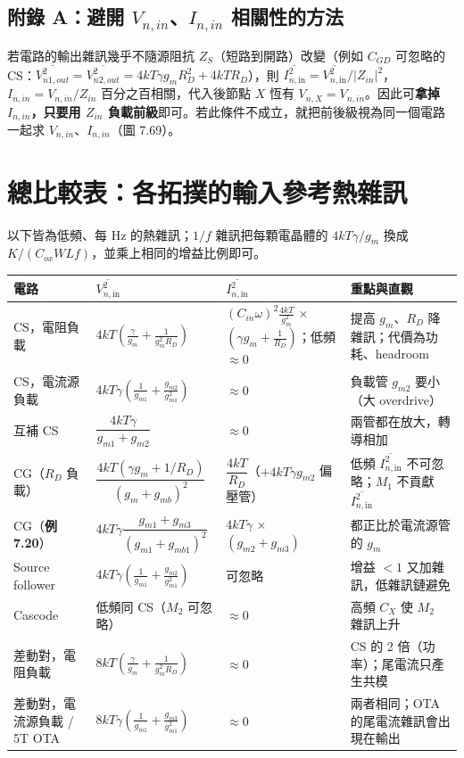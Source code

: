 \documentclass[11pt,a4paper]{article}
\newcommand{\Vsq}[1]{\overline{V^2_{n,\text{#1}}}}
\newcommand{\Isq}[1]{\overline{I^2_{n,\text{#1}}}}
\newcommand{\exref}[1]{\textcolor{extag}{\textbf{\sffamily 例 #1}}}
\begin{document}
\subsection{附錄 A：避開 $V_{n,in}$、$I_{n,in}$ 相關性的方法}
若電路的輸出雜訊幾乎不隨源阻抗 $Z_S$（短路到開路）改變（例如 $C_{GD}$ 可忽略的 CS：$\overline{V^2_{n1,out}}=\overline{V^2_{n2,out}}=4kT\gamma g_mR_D^2+4kTR_D$），則 $\Isq{in}=\Vsq{in}/|Z_{in}|^2$，$I_{n,in}=V_{n,in}/Z_{in}$ 百分之百相關，代入後節點 $X$ 恆有 $V_{n,X}=V_{n,in}$。因此可\textbf{拿掉 $I_{n,in}$，只要用 $Z_{in}$ 負載前級}即可。若此條件不成立，就把前後級視為同一個電路一起求 $V_{n,in}$、$I_{n,in}$（圖 7.69）。

\section{總比較表：各拓撲的輸入參考熱雜訊}
以下皆為低頻、每 Hz 的熱雜訊；$1/f$ 雜訊把每顆電晶體的 $4kT\gamma/g_m$ 換成 $K/(C_{ox}WLf)$，並乘上相同的增益比例即可。

\begin{tabularx}{\linewidth}{>{\raggedright}p{2.3cm}>{\raggedright}p{5.0cm}>{\raggedright}p{2.6cm}X}
\toprule
電路 & $\Vsq{in}$ & $\Isq{in}$ & 重點與直觀\tabularnewline\midrule
CS，電阻負載 & $4kT\left(\frac{\gamma}{g_m}+\frac{1}{g_m^2R_D}\right)$ & $(C_{in}\omega)^2\frac{4kT}{g_m^2}\,\times$ $(\gamma g_m+\frac1{R_D})$；低頻 $\approx0$ & 提高 $g_m$、$R_D$ 降雜訊；代價為功耗、headroom\tabularnewline
CS，電流源負載 & $4kT\gamma\left(\frac1{g_{m1}}+\frac{g_{m2}}{g_{m1}^2}\right)$ & $\approx0$ & 負載管 $g_{m2}$ 要小（大 overdrive）\tabularnewline
互補 CS & $\dfrac{4kT\gamma}{g_{m1}+g_{m2}}$ & $\approx0$ & 兩管都在放大，轉導相加\tabularnewline
CG（$R_D$ 負載） & $\dfrac{4kT(\gamma g_m+1/R_D)}{(g_m+g_{mb})^2}$ & $\dfrac{4kT}{R_D}$（$+4kT\gamma g_{m2}$ 偏壓管） & 低頻 $\Isq{in}$ 不可忽略；$M_1$ 不貢獻 $\Isq{in}$\tabularnewline
CG（\exref{7.20}） & $4kT\gamma\dfrac{g_{m1}+g_{m3}}{(g_{m1}+g_{mb1})^2}$ & $4kT\gamma\,\times$ $(g_{m2}+g_{m3})$ & 都正比於電流源管的 $g_m$\tabularnewline
Source follower & $4kT\gamma\left(\frac1{g_{m1}}+\frac{g_{m2}}{g_{m1}^2}\right)$ & 可忽略 & 增益 $<1$ 又加雜訊，低雜訊鏈避免\tabularnewline
Cascode & 低頻同 CS（$M_2$ 可忽略） & $\approx0$ & 高頻 $C_X$ 使 $M_2$ 雜訊上升\tabularnewline
差動對，電阻負載 & $8kT\left(\frac{\gamma}{g_m}+\frac{1}{g_m^2R_D}\right)$ & $\approx0$ & CS 的 2 倍（功率）；尾電流只產生共模\tabularnewline
差動對，電流源負載 / 5T OTA & $8kT\gamma\left(\frac1{g_{m1}}+\frac{g_{m3}}{g_{m1}^2}\right)$ & $\approx0$ & 兩者相同；OTA 的尾電流雜訊會出現在輸出\tabularnewline
\bottomrule
\end{tabularx}
\end{document}
